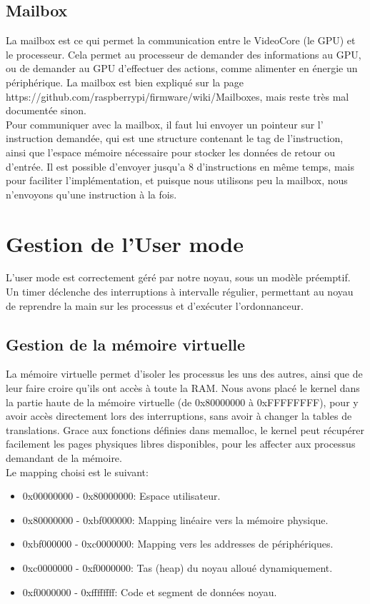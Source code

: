 \documentclass[a4paper]{article}
\begin{document}
\subsection{Mailbox}

La mailbox est ce qui permet la communication entre le VideoCore (le GPU) et le
processeur. Cela permet au processeur de demander des informations au GPU, ou
de demander au GPU d'effectuer des actions, comme alimenter en énergie un
périphérique. La mailbox est bien expliqué sur la page
https://github.com/raspberrypi/firmware/wiki/Mailboxes, mais reste très mal
documentée sinon.\\

Pour communiquer avec la mailbox, il faut lui envoyer un pointeur sur l'
instruction demandée, qui est une structure contenant le tag de
l'instruction, ainsi que l'espace mémoire nécessaire pour stocker les données de
retour ou d'entrée. Il est possible d'envoyer jusqu'a 8 d'instructions en même
temps, mais pour faciliter l'implémentation, et puisque nous utilisons peu la
mailbox, nous n'envoyons qu'une instruction à la fois.

\section{Gestion de l'User mode}
L'user mode est correctement géré par notre noyau, sous un modèle préemptif.
Un timer déclenche des interruptions à intervalle régulier, permettant au noyau
de reprendre la main sur les processus et d'exécuter l'ordonnanceur.

\subsection{Gestion de la mémoire virtuelle}
La mémoire virtuelle permet d'isoler les processus les uns des autres, ainsi que
de leur faire croire qu'ils ont accès à toute la RAM. Nous avons placé le kernel
dans la partie haute de la mémoire virtuelle (de 0x80000000 à 0xFFFFFFFF), pour
y avoir accès directement lors des interruptions, sans avoir à changer la tables
de translations. Grace aux fonctions définies dans memalloc, le kernel peut
récupérer facilement les pages physiques libres disponibles, pour les affecter
aux processus demandant de la mémoire. \\
Le mapping choisi est le suivant:
\begin{itemize}
	\item 0x00000000 - 0x80000000: Espace utilisateur.
	\item 0x80000000 - 0xbf000000: Mapping linéaire vers la mémoire physique.
	\item 0xbf000000 - 0xc0000000: Mapping vers les addresses de périphériques.
	\item 0xc0000000 - 0xf0000000: Tas (heap) du noyau alloué dynamiquement.
	\item 0xf0000000 - 0xffffffff: Code et segment de données noyau.
\end{itemize}
\end{document}
